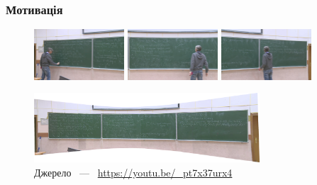 \begin{frame}
    \frametitle{Мотивація}
    \begin{figure}
        \includegraphics[width=0.3\textwidth]{images/kratnye_intergraly_left.png}
        \quad
        \includegraphics[width=0.3\textwidth]{images/kratnye_intergraly_center.png}
        \quad
        \includegraphics[width=0.3\textwidth]{images/kratnye_intergraly_right.png}
    \end{figure}
    \begin{figure}
        \includegraphics[width=0.75\textwidth]{images/kratnye_integraly_panorama.png}
        \caption{Джерело ~---~ \url{https://youtu.be/_pt7x37urx4}
        }
    \end{figure}
\end{frame}
